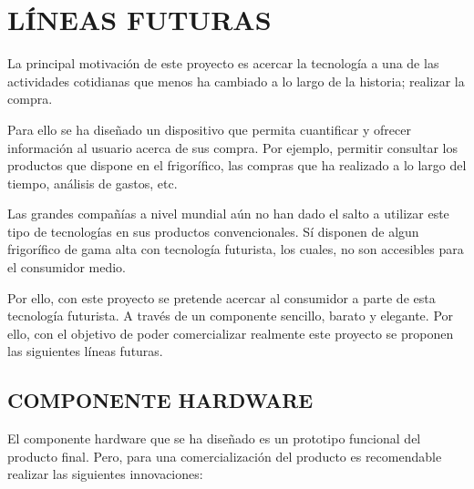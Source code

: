 \chapter{LÍNEAS FUTURAS}

La principal motivación de este proyecto es acercar la tecnología a una de las actividades cotidianas que menos ha cambiado a lo largo de la historia; realizar la compra.

Para ello se ha diseñado un dispositivo que permita cuantificar y ofrecer información al usuario acerca de sus compra. Por ejemplo, permitir consultar los productos que dispone en el frigorífico, las compras que ha realizado a lo largo del tiempo, análisis de gastos, etc.

Las grandes compañías a nivel mundial aún no han dado el salto a utilizar este tipo de tecnologías en sus productos convencionales. Sí disponen de algun frigorífico de gama alta con tecnología futurista, los cuales, no son accesibles para el consumidor medio.

Por ello, con este proyecto se pretende acercar al consumidor a parte de esta tecnología futurista. A través de un componente sencillo, barato y elegante. Por ello, con el objetivo de poder comercializar realmente este proyecto se proponen las siguientes líneas futuras.

\section{COMPONENTE HARDWARE}

El componente hardware que se ha diseñado es un prototipo funcional del producto final. Pero, para una comercialización del producto es recomendable realizar las siguientes innovaciones:

